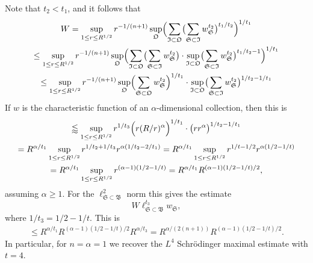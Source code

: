 \documentclass[biblatex]{pzorin-note}
\newcommand{\bB}{\mathfrak{B}} %
\newcommand{\bS}{\mathfrak{S}} %
\newcommand{\bO}{\mathfrak{O}} %
\newcommand{\bI}{\mathfrak{I}} %
\begin{document}
Note that $t_{2} < t_{1}$, and it follows that
\begin{multline*}
W
=
\sup_{1 \leq r \leq R^{1/2}} r^{-1/(n+1)} \sup_{\bO} \Bigl( \sum_{\bI \subset \bO} \bigl( \sum_{\bS \subset \bI} w_{\bS}^{t_{2}} \bigr)^{t_{1}/t_{2}}  \Bigr)^{1/t_{1}}\\
\leq
\sup_{1 \leq r \leq R^{1/2}} r^{-1/(n+1)} \sup_{\bO} \Bigl( \sum_{\bI \subset \bO} \bigl( \sum_{\bS \subset \bI} w_{\bS}^{t_{2}} \bigr) \cdot \sup_{\bI \subset \bO} \bigl( \sum_{\bS \subset \bI} w_{\bS}^{t_{2}} \bigr)^{t_{1}/t_{2}-1}  \Bigr)^{1/t_{1}}\\
\leq
\sup_{1 \leq r \leq R^{1/2}} r^{-1/(n+1)} \sup_{\bO} \Bigl( \sum_{\bS \subset \bO} w_{\bS}^{t_{2}} \Bigr)^{1/t_{1}} \cdot \sup_{\bI \subset \bO} \bigl( \sum_{\bS \subset \bI} w_{\bS}^{t_{2}} \bigr)^{1/t_{2}-1/t_{1}}
\end{multline*}
If $w$ is the characteristic function of an $\alpha$-dimensional collection, then this is
\begin{multline*}
\lessapprox
\sup_{1 \leq r \leq R^{1/2}} r^{1/t_{3}} \Bigl( r (R/r)^{\alpha} \Bigr)^{1/t_{1}} \cdot \bigl( r r^{\alpha} \bigr)^{1/t_{2}-1/t_{1}}\\
=
R^{\alpha/t_{1}} \sup_{1 \leq r \leq R^{1/2}} r^{1/t_{2}+1/t_{3}} r^{\alpha(1/t_{2}-2/t_{1})}
=
R^{\alpha/t_{1}} \sup_{1 \leq r \leq R^{1/2}} r^{1/t-1/2} r^{\alpha(1/2-1/t)}\\
=
R^{\alpha/t_{1}} \sup_{1 \leq r \leq R^{1/2}} r^{(\alpha-1)(1/2-1/t)}
=
R^{\alpha/t_{1}} R^{(\alpha-1)(1/2-1/t)/2},
\end{multline*}
assuming $\alpha \geq 1$.
For the $\ell^{2}_{\bS \subset \bB}$ norm this gives the estimate
\[
W \ell^{t_{3}}_{\bS \subset \bB} w_{\bS},
\]
where $1/t_{3} = 1/2 - 1/t$.
This is
\begin{multline*}
\leq
R^{\alpha/t_{1}} R^{(\alpha-1)(1/2-1/t)/2} R^{\alpha/t_{3}}
=
R^{\alpha/(2(n+1))} R^{(\alpha-1)(1/2-1/t)/2}.
\end{multline*}
In particular, for $n=\alpha=1$ we recover the $L^{4}$ Schr\"odinger maximal estimate with $t=4$.
\end{document}
